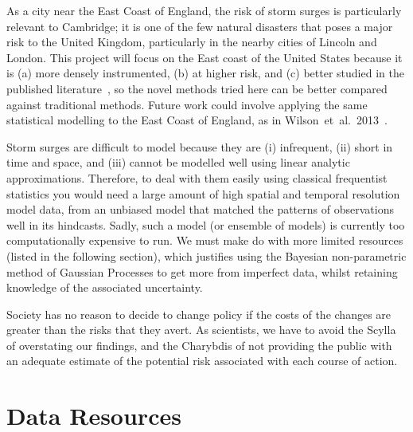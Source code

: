 \documentclass[usenames, dvipsnames, twocolumn]{article}
\begin{document}
As a city near the East Coast of England, the risk of
storm surges is particularly relevant to Cambridge;
it is one of the few natural disasters that
poses a major risk to the United Kingdom, particularly in the nearby cities of
Lincoln and London. This project will focus on the East coast of the United States because it is
 (a) more densely instrumented, (b) at higher risk, and
 (c) better studied in the published literature~\cite{ZannaPreprint},
 so the novel methods tried here can be better compared against traditional methods.
  Future work could involve applying the same statistical modelling to the East Coast of England,
   as in  Wilson~et~al.~2013~\cite{wilson2013tide}.

Storm surges are difficult to model because they are (i) infrequent, (ii) short in time and space,
and  (iii) cannot be modelled well using linear analytic approximations.
Therefore, to deal with them easily using classical
frequentist statistics you would need a large amount of high spatial and temporal resolution
model data, from an unbiased model that matched the patterns of observations well in
its hindcasts. Sadly, such a model (or ensemble of models) is currently too
computationally expensive to run.  We must make do with more limited resources
 (listed in the following section), which justifies using the Bayesian non-parametric
  method of Gaussian Processes to get more from imperfect data, whilst retaining
   knowledge of the associated uncertainty.

Society has no reason to decide to change policy if the costs of the changes are greater than the risks that they avert. As scientists, we have to avoid the Scylla of overstating our findings, and the Charybdis of not providing the public with an adequate estimate of the potential risk associated with each course of action.

\section{Data Resources}
\end{document}
